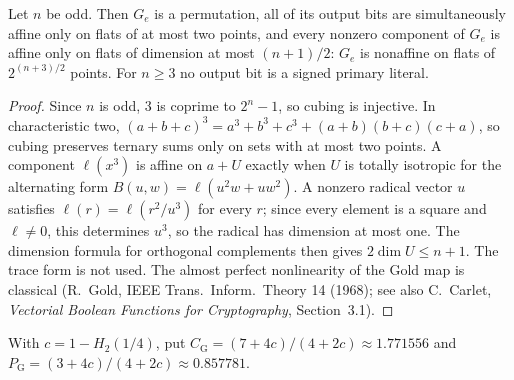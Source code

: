 \begin{theorem}
  \label{thm:lowerbounds-algebraic-geometry-gold-properties}
  \leanok
  Let $n$ be odd. Then $G_e$ is a permutation, all of its output bits are
  simultaneously affine only on flats of at most two points, and every nonzero
  component of $G_e$ is affine only on flats of dimension at most $(n+1)/2$: $G_e$
  is nonaffine on flats of $2^{(n+3)/2}$ points. For $n\ge3$ no output bit is a
  signed primary literal.
\end{theorem}
\begin{proof}
  \leanok
  Since $n$ is odd, $3$ is coprime to $2^n-1$, so cubing is injective. In
  characteristic two,
  $(a+b+c)^3=a^3+b^3+c^3+(a+b)(b+c)(c+a)$, so cubing preserves ternary sums only on
  sets with at most two points. A component $\ell(x^3)$ is affine on $a+U$ exactly
  when $U$ is totally isotropic for the alternating form
  $B(u,w)=\ell(u^2w+uw^2)$. A nonzero radical vector $u$ satisfies
  $\ell(r)=\ell(r^2/u^3)$ for every $r$; since every element is a square and
  $\ell\ne0$, this determines $u^3$, so the radical has dimension at most one. The
  dimension formula for orthogonal complements then gives $2\dim U\le n+1$. The
  trace form is not used. The almost perfect nonlinearity of the Gold map is
  classical (R.~Gold, IEEE Trans.\ Inform.\ Theory 14 (1968); see also C.~Carlet,
  \emph{Vectorial Boolean Functions for Cryptography}, Section~3.1).
\end{proof}

\begin{definition}
  \label{def:lowerbounds-algebraic-geometry-gold-coefficients}
  \leanok
  With $c=1-H_2(1/4)$, put $C_{\mathrm G}=(7+4c)/(4+2c)\approx1.771556$ and
  $P_{\mathrm G}=(3+4c)/(4+2c)\approx0.857781$.
\end{definition}

